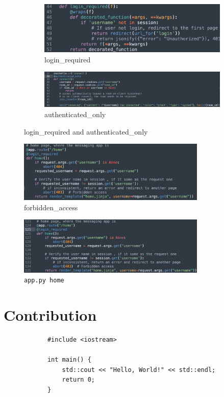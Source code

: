 \documentclass[12pt]{article}
\begin{document}
        \begin{figure}[H]
            \centering
            \begin{subfigure}[b]{0.75\textwidth}
                \centering
                \includegraphics[width=\textwidth]{graphs/login_required.jpg}
                \caption{login\_required}
            \end{subfigure}
            \hfill 
            \begin{subfigure}[b]{0.75\textwidth}
                \centering
                \includegraphics[width=\textwidth]{graphs/authenticated_only.jpg}
                \caption{authenticated\_only}
            \end{subfigure}
            \caption{login\_required and authenticated\_only}
            \label{wrappers}
        \end{figure}

        \begin{figure}[H]
            \centering
            \includegraphics[width=0.8\textwidth]{graphs/forbidden_access.jpg}
            \caption{forbidden\_access}
            \label{forbidden access}{}
        \end{figure}


        \begin{figure}[H]
            \centering
            \includegraphics[width=0.8\textwidth]{graphs/home_session.jpg}
            \caption{\texttt{app.py home}}
            \label{home session}
        \end{figure}

\section{Contribution}

        \begin{verbatim}
            #include <iostream>

            int main() {
                std::cout << "Hello, World!" << std::endl;
                return 0;
            }
        \end{verbatim}
\end{document}
